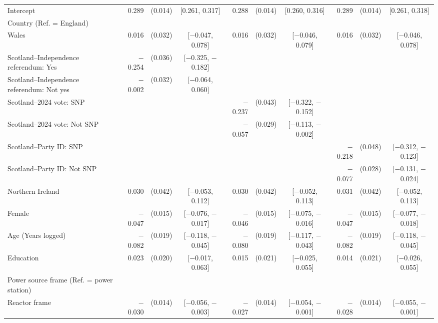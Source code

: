 \begin{landscape}
\begin{longtable}[t]{>{\raggedright\arraybackslash}p{2.8in}rrcrrcrrc}
\endfoot
\bottomrule
\endlastfoot
Intercept & 0.289 & (0.014) & {}[0.261, 0.317] & 0.288 & (0.014) & {}[0.260, 0.316] & 0.289 & (0.014) & {}[0.261, 0.318]\\
Country (Ref. = England) &  &  &  &  &  &  &  &  & \\
\hspace{1em}Wales & 0.016 & (0.032) & {}[$-$0.047, 0.078] & 0.016 & (0.032) & {}[$-$0.046, 0.079] & 0.016 & (0.032) & {}[$-$0.046, 0.078]\\
\hspace{1em}Scotland--Independence referendum: Yes & $-$0.254 & (0.036) & {}[$-$0.325, $-$0.182] &  &  &  &  &  & \\
\hspace{1em}Scotland--Independence referendum: Not yes & $-$0.002 & (0.032) & {}[$-$0.064, 0.060] &  &  &  &  &  & \\
\hspace{1em}Scotland--2024 vote: SNP &  &  &  & $-$0.237 & (0.043) & {}[$-$0.322, $-$0.152] &  &  & \\
\hspace{1em}Scotland--2024 vote: Not SNP &  &  &  & $-$0.057 & (0.029) & {}[$-$0.113, $-$0.002] &  &  & \\
\hspace{1em}Scotland--Party ID: SNP &  &  &  &  &  &  & $-$0.218 & (0.048) & {}[$-$0.312, $-$0.123]\\
\hspace{1em}Scotland--Party ID: Not SNP &  &  &  &  &  &  & $-$0.077 & (0.028) & {}[$-$0.131, $-$0.024]\\
\hspace{1em}Northern Ireland & 0.030 & (0.042) & {}[$-$0.053, 0.112] & 0.030 & (0.042) & {}[$-$0.052, 0.113] & 0.031 & (0.042) & {}[$-$0.052, 0.113]\\
Female & $-$0.047 & (0.015) & {}[$-$0.076, $-$0.017] & $-$0.046 & (0.015) & {}[$-$0.075, $-$0.016] & $-$0.047 & (0.015) & {}[$-$0.077, $-$0.018]\\
Age (Years logged) & $-$0.082 & (0.019) & {}[$-$0.118, $-$0.045] & $-$0.080 & (0.019) & {}[$-$0.117, $-$0.043] & $-$0.082 & (0.019) & {}[$-$0.118, $-$0.045]\\
Education & 0.023 & (0.020) & {}[$-$0.017, 0.063] & 0.015 & (0.021) & {}[$-$0.025, 0.055] & 0.014 & (0.021) & {}[$-$0.026, 0.055]\\
Power source frame (Ref. = power station) &  &  &  &  &  &  &  &  & \\
\hspace{1em}Reactor frame & $-$0.030 & (0.014) & {}[$-$0.056, $-$0.003] & $-$0.027 & (0.014) & {}[$-$0.054, $-$0.001] & $-$0.028 & (0.014) & {}[$-$0.055, $-$0.001]\\

\end{longtable}
\end{landscape}
